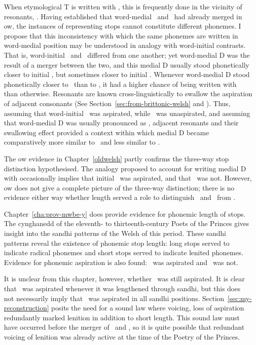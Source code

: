 When etymological \gls{T} is written with , this is frequently done in the vicinity of resonants, \ie {}. Having established that word-medial \xD\ and \lT\ had already merged in \gls{ow}, the instances of  representing stops cannot constitute different phonemes. I propose that this inconsistency with which the same phonemes are written in word-medial position may be understood in analogy with word-initial contrasts. That is, word-initial \lT\ and \xD\ differed from one another; yet word-medial \gls{D} was the result of a merger between the two, and this medial \gls{D} usually stood phonetically closer to initial \lT, but sometimes closer to initial \xD. Whenever word-medial \gls{D} stood phonetically closer to \xD\ than to \lT, it had a higher chance of being written with  than otherwise. Resonants are known cross-linguistically to swallow the aspiration of adjacent consonants (See Section~\ref{sec:from-brittonic-welsh} and \textcite{koch_*cothairche_1990}). Thus, assuming that word-initial \lT\ was aspirated, while \xD\ was unaspirated, and assuming that word-medial \gls{D} was usually pronounced as \lT, adjacent resonants and their swallowing effect provided a context within which medial \gls{D} became comparatively more similar to \xD\ and less similar to \lT.

The \gls{ow} evidence in Chapter~\ref{oldwelsh} partly confirms the three-way stop distinction hypothesised. The analogy proposed to account for writing medial \gls{D} with  occasionally implies that initial \lT\ was aspirated, and that \xD\ was not. However, \gls{ow} does not give a complete picture of the three-way distinction; there is no evidence either way whether length served a role to distinguish \xT\ and \xD\ from \lT.

Chapter~\ref{cha:prov-mwbe-y} does provide evidence for phonemic length of stops. The cynghanedd of the eleventh- to thirteenth-century Poets of the Princes gives insight into the sandhi patterns of the Welsh of this period. These sandhi patterns reveal the existence of phonemic stop length: long stops served to indicate radical phonemes and short stops served to indicate lenited phonemes. Evidence for phonemic aspiration is also found: \xT\ was aspirated and \xD\ was not.

It is unclear from this chapter, however, whether \lT\ was still aspirated. It is clear that \lT\ was aspirated whenever it was lengthened through sandhi, but this does not necessarily imply that \lT\ was aspirated in all sandhi positions. Section~\ref{sec:my-reconstruction} posits the need for a sound law where voicing, \ie loss of aspiration redundantly marked lenition in addition to short length. This sound law must have occurred before the merger of \lT\ and \xD, so it is quite possible that redundant voicing of lenition was already active at the time of the Poetry of the Princes.

